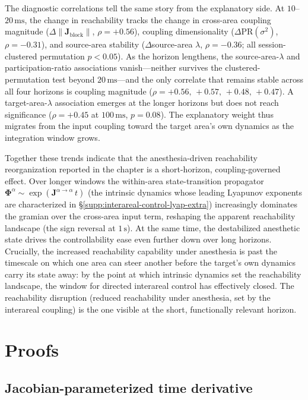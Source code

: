 The diagnostic correlations tell the same story from the explanatory side. At $10$--$20\,\mathrm{ms}$, the change in reachability tracks the change in cross-area coupling magnitude ($\Delta\|\mathbf{J}_{\mathrm{block}}\|$, $\rho=+0.56$), coupling dimensionality ($\Delta\mathrm{PR}(\sigma^{2})$, $\rho=-0.31$), and source-area stability ($\Delta$source-area $\lambda$, $\rho=-0.36$; all session-clustered permutation $p<0.05$). As the horizon lengthens, the source-area-$\lambda$ and participation-ratio associations vanish---neither survives the clustered-permutation test beyond $20\,\mathrm{ms}$---and the only correlate that remains stable across all four horizons is coupling magnitude ($\rho=+0.56,\,+0.57,\,+0.48,\,+0.47$). A target-area-$\lambda$ association emerges at the longer horizons but does not reach significance ($\rho=+0.45$ at $100\,\mathrm{ms}$, $p=0.08$). The explanatory weight thus migrates from the input coupling toward the target area's own dynamics as the integration window grows.

Together these trends indicate that the anesthesia-driven reachability reorganization reported in the chapter is a short-horizon, coupling-governed effect. Over longer windows the within-area state-transition propagator $\mathbf{\Phi}^{\alpha}\sim\exp(\mathbf{J}^{\alpha\to\alpha}\,t)$ (the intrinsic dynamics whose leading Lyapunov exponents are characterized in \S\ref{supp:interareal-control-lyap-extra}) increasingly dominates the gramian over the cross-area input term, reshaping the apparent reachability landscape (the sign reversal at $1\,\mathrm{s}$). At the same time, the destabilized anesthetic state drives the controllability ease even further down over long horizons. Crucially, the increased reachability capability under anesthesia is past the timescale on which one area can steer another before the target's own dynamics carry its state away: by the point at which intrinsic dynamics set the reachability landscape, the window for directed interareal control has effectively closed. The reachability disruption (reduced reachability under anesthesia, set by the interareal coupling) is the one visible at the short, functionally relevant horizon.

\FloatBarrier

\section{Proofs}\label{supp:interareal-control-proofs}

\subsection{Jacobian-parameterized time derivative}\label{supp:interareal-control-proof-Fjac}

